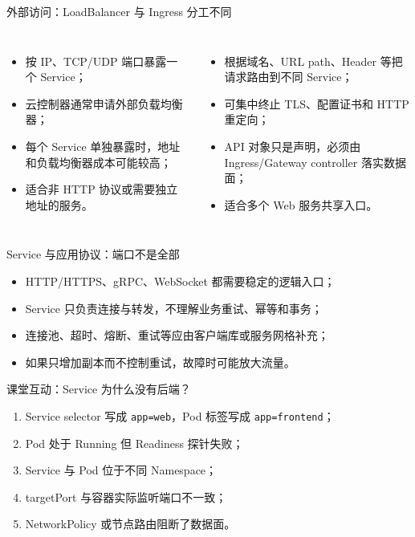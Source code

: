 \documentclass[UTF8,fontset=none,aspectratio=169,10pt]{beamer}
\begin{document}
\begin{frame}{外部访问：LoadBalancer 与 Ingress 分工不同}
\begin{columns}[T,onlytextwidth]
\begin{itemize}
  \item 按 IP、TCP/UDP 端口暴露一个 Service；
  \item 云控制器通常申请外部负载均衡器；
  \item 每个 Service 单独暴露时，地址和负载均衡器成本可能较高；
  \item 适合非 HTTP 协议或需要独立地址的服务。
\end{itemize}
\begin{itemize}
  \item 根据域名、URL path、Header 等把请求路由到不同 Service；
  \item 可集中终止 TLS、配置证书和 HTTP 重定向；
  \item API 对象只是声明，必须由 Ingress/Gateway controller 落实数据面；
  \item 适合多个 Web 服务共享入口。
\end{itemize}
\end{columns}
\vfill
{}
\end{frame}

\begin{frame}{Service 与应用协议：端口不是全部}
\begin{itemize}
  \item HTTP/HTTPS、gRPC、WebSocket 都需要稳定的逻辑入口；
  \item Service 只负责连接与转发，不理解业务重试、幂等和事务；
  \item 连接池、超时、熔断、重试等应由客户端库或服务网格补充；
  \item 如果只增加副本而不控制重试，故障时可能放大流量。
\end{itemize}
\vfill
{}
\end{frame}

\begin{frame}{课堂互动：Service 为什么没有后端？}
\begin{enumerate}
  \item Service selector 写成 \texttt{app=web}，Pod 标签写成 \texttt{app=frontend}；
  \item Pod 处于 Running 但 Readiness 探针失败；
  \item Service 与 Pod 位于不同 Namespace；
  \item targetPort 与容器实际监听端口不一致；
  \item NetworkPolicy 或节点路由阻断了数据面。
\end{enumerate}
\vfill
{}
\end{frame}
\end{document}
